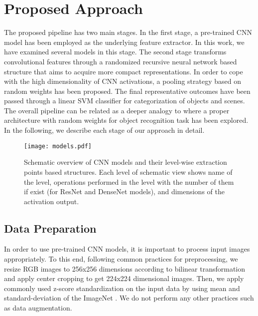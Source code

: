 \documentclass[10pt,journal,compsoc]{IEEEtran}
\begin{document}
\section{Proposed Approach}
\label{sec:method}
The proposed pipeline has two main stages. In the first stage, a pre-trained CNN model has been employed as the underlying feature extractor. In this work, we have examined several models in this stage. The second stage transforms convolutional features through a randomized recursive neural network based structure that aims to acquire more compact representations. In order to cope with the high dimensionality of CNN activations, a pooling strategy based on random weights has been proposed. The final representative outcomes have been passed through a linear SVM classifier for categorization of objects and scenes. The overall pipeline can be related as a deeper analogy to \cite{Jarrett_ICCV_2009} where a proper architecture with random weights for object recognition task has been explored. In the following, we describe each stage of our approach in detail.

\begin{figure*}[!t]
	\centering
	\texttt{[image: models.pdf]}
	\caption{Schematic overview of CNN models and their level-wise extraction points based structures. Each level of schematic view shows name of the level, operations performed in the level with the number of them if exist (for ResNet \cite{He_CVPR_2016} and DenseNet \cite{Huang_CVPR_2017} models), and dimensions of the activation output.}
	\label{fig:Models}
\end{figure*}

\subsection{Data Preparation} \label{sec:dataPreparation}
In order to use pre-trained CNN models, it is important to process input images appropriately. To this end, following common practices for preprocessing, we resize RGB images to 256x256 dimensions according to bilinear transformation and apply center cropping to get 224x224 dimensional images. Then, we apply commonly used z-score standardization on the input data by using mean and standard-deviation of the ImageNet \cite{Deng_Imagenet_CVPR_2009}. We do not perform any other practices such as data augmentation.
\end{document}
